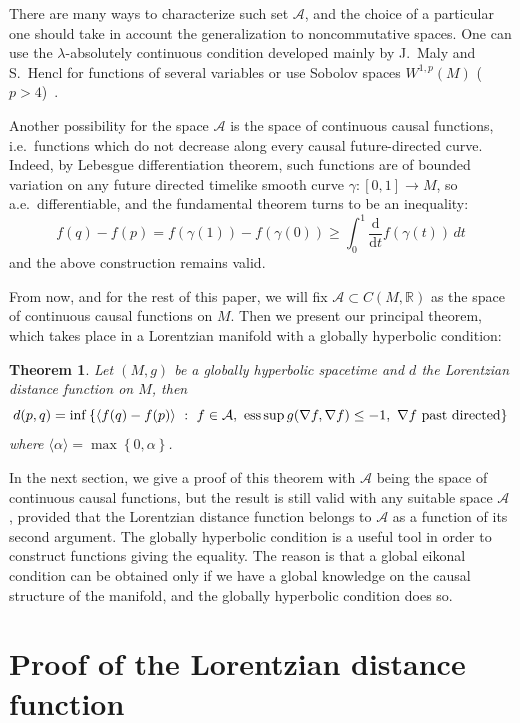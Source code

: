 \documentclass[11pt]{article}
\newtheorem{theorem}{Theorem}
\newcommand{\set}[1]{\left\{ {#1} \right\}}
\newcommand{\dv}[2]{\frac{\mathrm d{#1}}{\mathrm d{#2}}}
\newcommand{\setR}{{\mathbb R}}
\begin{document}
There are many ways to characterize such set $\mathcal A$, and the choice of a particular one should take in account the generalization to noncommutative spaces. One can use the $\lambda$-absolutely continuous condition developed mainly by J.~Maly and S.~Hencl for functions of several variables or use Sobolov spaces $W^{1,p}(M)$ ($p>4$)~\cite{Hen,Mal}.

Another possibility for the space $\mathcal A$ is the space of continuous causal functions, i.e.\ functions which do not decrease along every causal future-directed curve. Indeed, by Lebesgue dif\/ferentiation theorem, such functions are of bounded variation on any future directed timelike smooth curve $\gamma : [0,1] \rightarrow M$, so a.e.\ dif\/ferentiable, and the fundamental theorem turns to be an inequality:
\[
f(q) - f(p) = f(\gamma(1)) - f(\gamma(0)) \geq \int_0^1 \dv{}{t} f(\gamma(t)) \, dt
\]
and the above construction remains valid.

From now, and for the rest of this paper, we will f\/ix $\mathcal A \subset C(M,\setR)$ as the space of continuous causal functions on $M$. Then we present our principal theorem, which takes place in a Lorentzian manifold with a globally hyperbolic condition:

\begin{theorem}\label{mainth}
Let $(M,g)$ be a globally hyperbolic spacetime and $d$ the Lorentzian distance function on $M$, then
\[
d(p,q) = \inf\set{ \langle f(q)-f(p) \rangle \ :\  f \in \mathcal A,\  \text{\rm ess} \sup g( \nabla f, \nabla f ) \leq -1, \ \nabla f \text{ past directed}}
\]
where $\langle \alpha \rangle = \max\set{0,\alpha}$.

\end{theorem}

In the next section, we give a proof of this theorem with $\mathcal A$ being the space of continuous causal functions, but the result is still valid with any suitable space $\mathcal A$, provided that the Lorentzian distance function belongs to $\mathcal A$ as a function of its second argument. The globally hyperbolic condition is a useful tool in order to construct functions giving the equality. The reason is that a global eikonal condition can be obtained only if we have a global knowledge on the causal structure of the manifold, and the globally hyperbolic condition does so.


\section{Proof of the Lorentzian distance function}
\end{document}
